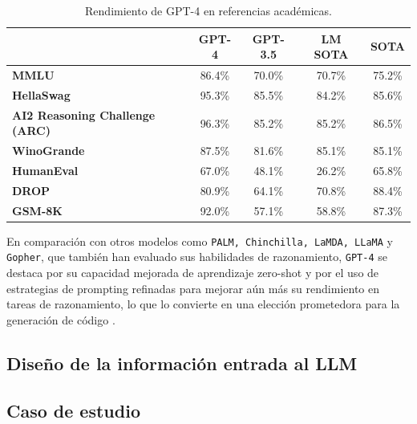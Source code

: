 \begin{table}[H]
  \centering
  \caption{Rendimiento de GPT-4 en referencias académicas. \cite{}}
  \begin{tabularx}{\textwidth}{Xcccc}
    \toprule
    & \textbf{GPT-4} & \textbf{GPT-3.5} & \textbf{LM SOTA} & \textbf{SOTA} \\
    \midrule
    \textbf{MMLU} & 86.4\% & 70.0\% & 70.7\% & 75.2\% \\
    \textbf{HellaSwag} & 95.3\% & 85.5\% & 84.2\% & 85.6\% \\
    \textbf{AI2 Reasoning Challenge (ARC)} & 96.3\% & 85.2\% & 85.2\% & 86.5\% \\
    \textbf{WinoGrande} & 87.5\% & 81.6\% & 85.1\% & 85.1\% \\
    \textbf{HumanEval} & 67.0\% & 48.1\% & 26.2\% & 65.8\% \\
    \textbf{DROP} & 80.9\% & 64.1\% & 70.8\% & 88.4\% \\
    \textbf{GSM-8K} & 92.0\% & 57.1\% & 58.8\% & 87.3\% \\
    \bottomrule
  \end{tabularx}
  \label{tab:my_label}
\end{table}

En comparación con otros modelos como \texttt{PALM, Chinchilla, LaMDA, LLaMA} y \texttt{Gopher}, que también han evaluado sus habilidades de razonamiento,  \texttt{GPT-4} se destaca por su capacidad mejorada de aprendizaje zero-shot y por el uso de estrategias de prompting refinadas para mejorar aún más su rendimiento en tareas de razonamiento, lo que lo convierte en una elección prometedora para la generación de código \cite{}.

\subsection{Diseño de la información entrada al LLM} \label{prompt_design}

\subsection{Caso de estudio} \label{sample_case}